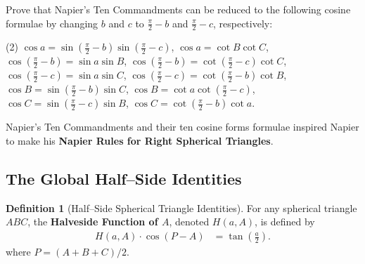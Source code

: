\documentclass[12pt,a4paper]{memoir}
\theoremstyle{definition}
\newtheorem*{definition}{Definition}
\begin{document}
	\begin{question}
		Prove that Napier's Ten Commandments can be reduced to the following cosine formulae by changing $b$ and $c$ to $\frac{\pi}{2}-b$ and $\frac{\pi}{2}-c$, respectively:
		\begin{tasks}(2)
			\task $\displaystyle\cos a = \sin\left(\frac{\pi}{2}-b\right)\sin\left(\frac{\pi}{2}-c\right)$,
			\task $\displaystyle\cos a = \cot B \cot C$,
			\task $\displaystyle\cos \left(\frac{\pi}{2}-b\right) = \sin a \sin B$,
			\task $\displaystyle\cos \left(\frac{\pi}{2}-b\right) = \cot \left(\frac{\pi}{2}-c\right) \cot C$,
			\task $\displaystyle\cos \left(\frac{\pi}{2}-c\right) = \sin a \sin C$,
			\task $\displaystyle\cos \left(\frac{\pi}{2}-c\right) = \cot \left(\frac{\pi}{2}-b\right) \cot B$,
			\task $\displaystyle\cos B = \sin \left(\frac{\pi}{2}-b\right) \sin C$,
			\task $\displaystyle\cos B = \cot a \cot \left(\frac{\pi}{2}-c\right)$,
			\task $\displaystyle\cos C = \sin \left(\frac{\pi}{2}-c\right) \sin B$,
			\task $\displaystyle\cos C = \cot \left(\frac{\pi}{2}-b\right) \cot a$.
		\end{tasks}
		Napier's Ten Commandments and their ten cosine forms formulae inspired Napier to make his \textbf{Napier Rules for Right Spherical Triangles}.
	\end{question}


\subsection{The Global Half--Side Identities}

	\begin{definition}[Half--Side Spherical Triangle Identities] 
		For any spherical triangle $ABC$, the \textbf{Halveside Function of $A$}, denoted $H(a,A)$, is defined by
		\begin{align*}
			H(a,A)\cdot\cos(P-A)&=\tan \left({\frac {a}{2}}\right).
		\end{align*}
		where $P=(A+B+C)/2$.
	\end{definition}
	
\end{document}

